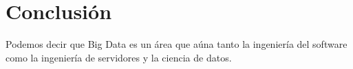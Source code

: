 \documentclass[10pt]{article}
\begin{document}
\section{Conclusión} \label{sec:conclusion}

	Podemos decir que Big Data es un área que aúna tanto la ingeniería del software como la ingeniería de servidores y la ciencia de datos.


\printbibliography
\end{document}
